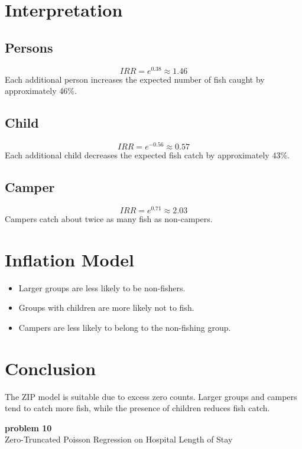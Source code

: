 \documentclass[12pt]{article}
\begin{document}
\section*{Interpretation}

\subsection*{Persons}
\[ IRR = e^{0.38} \approx 1.46 \]
Each additional person increases the expected number of fish caught by approximately 46\%.

\subsection*{Child}
\[ IRR = e^{-0.56} \approx 0.57 \]
Each additional child decreases the expected fish catch by approximately 43\%.

\subsection*{Camper}
\[ IRR = e^{0.71} \approx 2.03 \]
Campers catch about twice as many fish as non-campers.

\section*{Inflation Model}

\begin{itemize}
    \item Larger groups are less likely to be non-fishers.
    \item Groups with children are more likely not to fish.
    \item Campers are less likely to belong to the non-fishing group.
\end{itemize}

\section*{Conclusion}

The ZIP model is suitable due to excess zero counts. Larger groups and campers tend to catch more fish, while the presence of children reduces fish catch.

\newpage

\begin{center}
    {\LARGE \textbf{ problem 10}}\\[0.3cm]
    {\large Zero-Truncated Poisson Regression on Hospital Length of Stay }
\end{center}
\end{document}
